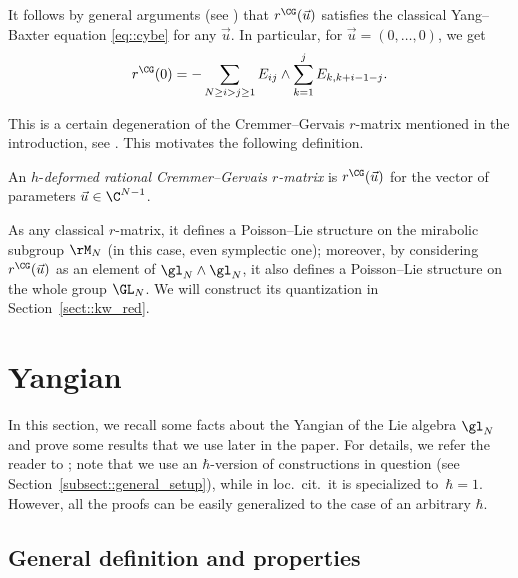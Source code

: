 	It follows by general arguments (see \cite{EtingofSchiffmannQuantumGroups}) that $r^{\CG}(\vec{u})$ satisfies the classical Yang--Baxter equation \eqref{eq::cybe} for any $\vec{u}$. In particular, for $\vec{u}=(0,\dots,0)$, we get
	\[
	r^{\CG}(0) = -\sum\limits_{N \geq i > j \geq 1} E_{ij} \wedge \sum\limits_{k=1}^j E_{k,k+i-1-j}.
	\]
	
	
	This is a certain degeneration of the Cremmer--Gervais $r$-matrix mentioned in the introduction, see \cite{EndelmanHodges}. This motivates the following definition.
	\begin{Definition}
		\label{def::cg_class_r_mat}
		An $h$-\emph{deformed rational Cremmer--Gervais $r$-matrix} is $r^{\CG}(\vec{u})$ for the vector of parameters $\vec{u}\in \C^{N-1}$.
	\end{Definition}
	
	As any classical $r$-matrix, it defines a Poisson--Lie structure on the mirabolic subgroup $\rM_N$ (in this case, even symplectic one); moreover, by considering $r^{\CG}(\vec{u})$ as an element of $\gl_N \wedge \gl_N$, it also defines a Poisson--Lie structure on the whole group $\GL_N$. We will construct its quantization in Section~\ref{sect::kw_red}.
	
	
	\section{Yangian}
	\label{sect::basics}
	
	In this section, we recall some facts about the Yangian of the Lie algebra $\gl_N$ and prove some results that we use later in the paper. For details, we refer the reader to \cite{MolevYangians}; note that we use an $\hbar$-version of constructions in question (see Section~\ref{subsect::general_setup}), while in loc.\ cit.\  it is specialized to~${\hbar=1}$. However, all the proofs can be easily generalized to the case of an arbitrary $\hbar$.
	
	\subsection{General definition and properties}

